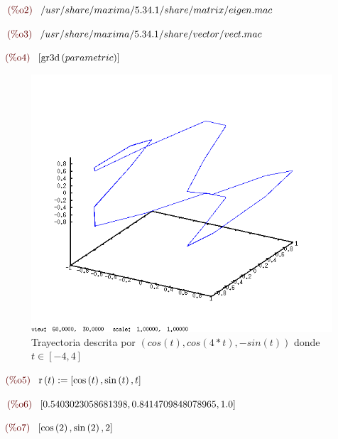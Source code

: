 \documentclass[12pt]{article}
\begin{document}
\begin{math}\displaystyle
\parbox{8ex}{\color{labelcolor}(\%o2) }
/usr/share/maxima/5.34.1/share/matrix/eigen.mac
\end{math}

\begin{math}\displaystyle
\parbox{8ex}{\color{labelcolor}(\%o3) }
/usr/share/maxima/5.34.1/share/vector/vect.mac
\end{math}

\begin{math}\displaystyle
\parbox{8ex}{\color{labelcolor}(\%o4) }
[\mathrm{gr3d}\left( parametric\right) ]
\end{math}

\begin{figure}[H]
\centering
\includegraphics[scale=0.5]{2.png}
\caption{Trayectoria descrita por $(cos(t),cos(4*t),-sin(t))$ donde $t\in[-4,4]$ }
\end{figure}

\begin{math}\displaystyle
\parbox{8ex}{\color{labelcolor}(\%o5) }
\mathrm{r}\left( t\right) :=[\mathrm{cos}\left( t\right) ,\mathrm{sin}\left( t\right) ,t]
\end{math}

\begin{math}\displaystyle
\parbox{8ex}{\color{labelcolor}(\%o6) }
[0.5403023058681398,0.8414709848078965,1.0]
\end{math}

\begin{math}\displaystyle
\parbox{8ex}{\color{labelcolor}(\%o7) }
[\mathrm{cos}\left( 2\right) ,\mathrm{sin}\left( 2\right) ,2]
\end{math}
\end{document}

